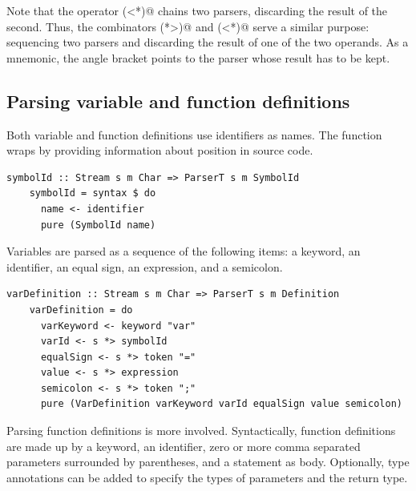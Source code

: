 \documentclass[UdineBachThesis,american,11pt]{PhdThesis}
\begin{document}
  Note that the operator \lstinline@(<*)@ chains two parsers, discarding the
  result of the second. Thus, the combinators \lstinline@(*>)@ and
  \lstinline@(<*)@ serve a similar purpose: sequencing two parsers and
  discarding the result of one of the two operands. As a mnemonic, the angle
  bracket points to the parser whose result has to be kept.

  \newpage

  \subsection{Parsing variable and function definitions}

  Both variable and function definitions use identifiers as names. The function
  \lstinline@symbolId@ wraps \lstinline@identifier@ by providing information
  about position in source code.

  \begin{lstlisting}[gobble=4,basicstyle=\ttfamily\small]
    symbolId :: Stream s m Char => ParserT s m SymbolId
    symbolId = syntax $ do
      name <- identifier
      pure (SymbolId name)
  \end{lstlisting}

  Variables are parsed as a sequence of the following items: a \lstinline@var@
  keyword, an identifier, an equal sign, an expression, and a semicolon.

  \begin{lstlisting}[gobble=4,basicstyle=\ttfamily\small]
    varDefinition :: Stream s m Char => ParserT s m Definition
    varDefinition = do
      varKeyword <- keyword "var"
      varId <- s *> symbolId
      equalSign <- s *> token "="
      value <- s *> expression
      semicolon <- s *> token ";"
      pure (VarDefinition varKeyword varId equalSign value semicolon)
  \end{lstlisting}

  Parsing function definitions is more involved. Syntactically, function
  definitions are made up by a \lstinline@def@ keyword, an identifier, zero or
  more comma separated parameters surrounded by parentheses, and a statement as
  body. Optionally, type annotations can be added to specify the types of
  parameters and the return type.
\end{document}
